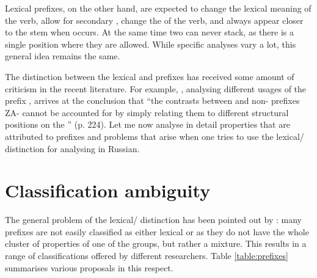 Lexical prefixes, on the other hand, are expected to change the lexical meaning of the verb, allow for secondary , change the  of the verb, and always appear closer to the stem when  occurs. At the same time two  can never stack, as there is a single position where they are allowed. While specific analyses vary a lot, this general idea remains the same. 

The distinction between the lexical and  prefixes has received some amount of criticism in the recent literature. For example, \citet{Braginsky:08}, analysing different usages of the prefix , arrives at the conclusion that ``the contrasts
between  and non- prefixes ZA- cannot be accounted for by
simply relating them to different structural positions on the '' (p. 224). Let me now analyse in detail properties that are attributed to  prefixes and problems that arise when one tries to use the lexical/ distinction for analysing  in Russian.


\section{Classification ambiguity}\label{section:classification}
The general problem of the lexical/ distinction has been pointed out by \citet[32]{Kagan:book}: many prefixes are not easily classified as either lexical or  as they do not have the whole cluster of properties of one of the groups, but rather a mixture. This results in a range of classifications offered by different researchers. Table \ref{table:prefixes} summarises various proposals in this respect.


